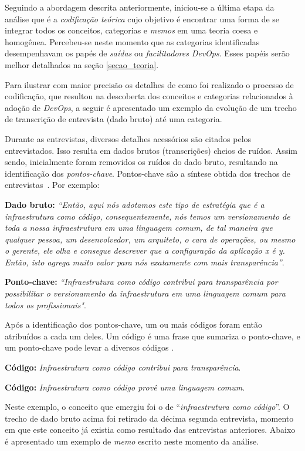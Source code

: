 Seguindo a abordagem descrita anteriormente, iniciou-se a última etapa da
análise que é a \emph{codificação teórica} cujo objetivo é encontrar uma forma
de se integrar todos os conceitos, categorias e {\it memos} em uma teoria coesa
e homogênea. Percebeu-se neste momento que as categorias identificadas
desempenhavam os papés de \emph{saídas} ou \emph{facilitadores} {\it DevOps}.
Esses papéis serão melhor detalhados na seção \ref{secao_teoria}.

Para ilustrar com maior precisão os detalhes de como foi realizado o processo
de codificação, que resultou na descoberta dos conceitos e categorias relacionados
à adoção de {\it DevOps}, a seguir
é apresentado um exemplo da evolução de um trecho de transcrição de entrevista
(dado bruto) até uma categoria.

Durante as entrevistas, diversos detalhes acessórios são citados
pelos entrevistados. Isso resulta em dados brutos (transcrições) cheios de
ruídos. Assim sendo, inicialmente foram removidos os ruídos do dado bruto,
resultando na identificação dos \emph{pontos-chave}. Pontos-chave são a síntese
obtida dos trechos de entrevistas~\cite{georgieva2008best}. Por exemplo:

\textbf{Dado bruto:} {\it ``Então, aqui nós adotamos este tipo de estratégia
que é a infraestrutura como código, consequentemente, nós temos um versionamento
de toda a nossa infraestrutura em uma linguagem comum, de tal maneira que
qualquer pessoa, um desenvolvedor, um arquiteto, o cara de operações, ou mesmo
o gerente, ele olha e consegue descrever que a configuração da aplicação x é
y. Então, isto agrega muito valor para nós exatamente com mais transparência''}.

\textbf{Ponto-chave:} \textit{``Infraestrutura como código contribui para
transparência por possibilitar o versionamento da infraestrutura em uma
linguagem comum para todos os profissionais"}.

Após a identificação dos pontos-chave, um ou mais códigos foram então atribuídos
a cada um deles. Um código é uma frase que sumariza o ponto-chave,
e um ponto-chave pode levar a diversos códigos \cite{hoda2017becoming}.

{\bf Código:} \textit{Infraestrutura como código contribui para transparência}.

{\bf Código:} \textit{Infraestrutura como código provê uma linguagem comum}.

Neste exemplo, o conceito que emergiu foi o de ``\emph{infraestrutura como
código}''. O trecho de dado bruto acima foi retirado da décima segunda entrevista,
momento em que este conceito já existia como resultado das entrevistas anteriores.
Abaixo é apresentado um exemplo de {\it memo} escrito neste momento da análise.

